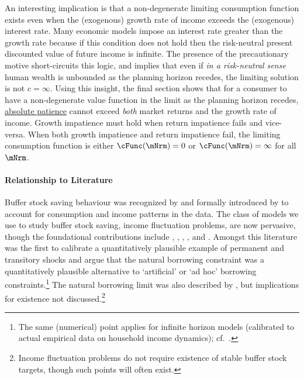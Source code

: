 \documentclass[BufferStockTheory]{subfiles}
\begin{document}
An interesting implication is that a non-degenerate limiting consumption function exists even when the (exogenous) growth rate of income exceeds the (exogenous) interest rate.
Many economic models impose an interest rate greater than the growth rate because if this condition does not hold then the risk-neutral present discounted value of future income is infinite.
The presence of the precautionary motive short-circuits this logic, and implies that even if \textit{in a risk-neutral sense} human wealth is unbounded as the planning horizon recedes, the limiting solution is not $c = \infty$.
Using this insight, the final section shows that for a consumer to have a non-degenerate value function in the limit as the planning horizon recedes, \hyperlink{APF}{absolute patience} cannot exceed \textit{both} market returns and the growth rate of income.
Growth impatience must hold when return impatience fails and vice-versa.
When both growth impatience and return impatience fail, the limiting consumption function is either $\cFunc(\mNrm)=0$ or $\cFunc(\mNrm)=\infty$ for all $\mNrm$.

\vspace{-1em}

\hypertarget{cfLiterature}{}
\hypertarget{DiffFromLit}{} 
\paragraph{Relationship to Literature}

Buffer stock saving behaviour was recognized by \cite{friedmanATheory} and formally introduced by \cite{carrollBSLCPIH} to account for consumption and income patterns in the data.
The class of models we use to study buffer stock saving, income fluctuation problems, are now pervasive, though the foundational contributions include \cite{bewleyPIH}, \cite{imrohorogluBusinessCycles}, \cite{zeldesStochastic}, \cite{deatonLiqConstr}, \cite{huggettRiskFreeRate} and \cite{aiyagari:ge}.
Amongst this literature \cite{zeldesStochastic} was the first to calibrate a quantitatively plausible example of permanent and transitory shocks and argue that the natural borrowing constraint was a quantitatively plausible alternative to `artificial' or `ad hoc' borrowing constraints.\footnote{The same (numerical) point applies for infinite horizon models (calibrated to actual empirical data on household income dynamics); cf.~\cite{carrollBrookings}.} The natural borrowing limit was also described by \cite{aiyagari:ge}, but implications for existence not discussed.\footnote{Income fluctuation problems do not require existence of stable buffer stock targets, though such points will often exist.}
\end{document}
